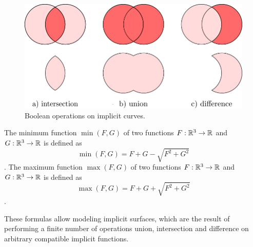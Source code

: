 \begin{figure}
    \centerline{\includegraphics[scale=0.5]{images/img19}}
    \caption[Boolean operations on implicit curves]
    {Boolean operations on implicit curves.}
    \label{img:19}
\end{figure}

\begin{theorem}
    The minimum function $\min(F, G)$ of two functions $F:\mathbb{R}^3 \to \mathbb{R}$ and
    $G:\mathbb{R}^3 \to \mathbb{R}$ is defined as $$\min(F, G) = F + G - \sqrt{F^2+G^2}$$.
    The maximum function $\max(F, G)$ of two functions $F:\mathbb{R}^3 \to \mathbb{R}$ and
    $G:\mathbb{R}^3 \to \mathbb{R}$ is defined as $$\max(F, G) = F + G + \sqrt{F^2+G^2}$$.
\end{theorem}

These formulas allow modeling implicit surfaces, which are the result of
performing a finite number of operations union, intersection and difference
on arbitrary compatible implicit functions.


